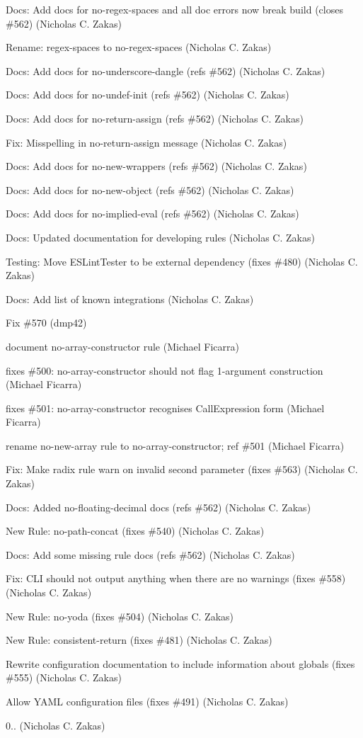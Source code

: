 \begin{DoxyItemize}
\item Docs\+: Add docs for no-\/regex-\/spaces and all doc errors now break build (closes \#562) (Nicholas C. Zakas)
\item Rename\+: regex-\/spaces to no-\/regex-\/spaces (Nicholas C. Zakas)
\item Docs\+: Add docs for no-\/underscore-\/dangle (refs \#562) (Nicholas C. Zakas)
\item Docs\+: Add docs for no-\/undef-\/init (refs \#562) (Nicholas C. Zakas)
\item Docs\+: Add docs for no-\/return-\/assign (refs \#562) (Nicholas C. Zakas)
\item Fix\+: Misspelling in no-\/return-\/assign message (Nicholas C. Zakas)
\item Docs\+: Add docs for no-\/new-\/wrappers (refs \#562) (Nicholas C. Zakas)
\item Docs\+: Add docs for no-\/new-\/object (refs \#562) (Nicholas C. Zakas)
\item Docs\+: Add docs for no-\/implied-\/eval (refs \#562) (Nicholas C. Zakas)
\item Docs\+: Updated documentation for developing rules (Nicholas C. Zakas)
\item Testing\+: Move E\+S\+Lint\+Tester to be external dependency (fixes \#480) (Nicholas C. Zakas)
\item Docs\+: Add list of known integrations (Nicholas C. Zakas)
\item Fix \#570 (dmp42)
\item document no-\/array-\/constructor rule (Michael Ficarra)
\item fixes \#500\+: no-\/array-\/constructor should not flag 1-\/argument construction (Michael Ficarra)
\item fixes \#501\+: no-\/array-\/constructor recognises Call\+Expression form (Michael Ficarra)
\item rename no-\/new-\/array rule to no-\/array-\/constructor; ref \#501 (Michael Ficarra)
\item Fix\+: Make radix rule warn on invalid second parameter (fixes \#563) (Nicholas C. Zakas)
\item Docs\+: Added no-\/floating-\/decimal docs (refs \#562) (Nicholas C. Zakas)
\item New Rule\+: no-\/path-\/concat (fixes \#540) (Nicholas C. Zakas)
\item Docs\+: Add some missing rule docs (refs \#562) (Nicholas C. Zakas)
\item Fix\+: C\+LI should not output anything when there are no warnings (fixes \#558) (Nicholas C. Zakas)
\item New Rule\+: no-\/yoda (fixes \#504) (Nicholas C. Zakas)
\item New Rule\+: consistent-\/return (fixes \#481) (Nicholas C. Zakas)
\item Rewrite configuration documentation to include information about globals (fixes \#555) (Nicholas C. Zakas)
\item Allow Y\+A\+ML configuration files (fixes \#491) (Nicholas C. Zakas)
\item 0.. (Nicholas C. Zakas)
\end{DoxyItemize}

